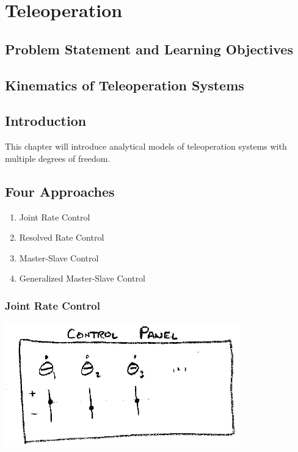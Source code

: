 %

\chapter{Teleoperation}

\section{Problem Statement and Learning Objectives}



%
%
%
%



\section*{Kinematics of Teleoperation Systems}

\section{Introduction}
This chapter will introduce analytical models of teleoperation systems with multiple degrees of freedom.



\section{Four Approaches}
\begin{enumerate}
	\item Joint Rate Control
	\item Resolved Rate Control
	\item Master-Slave Control
	\item Generalized Master-Slave Control
\end{enumerate}


\subsection{Joint Rate Control}

\includegraphics[width=4.0in]{figs14/00398.eps}

